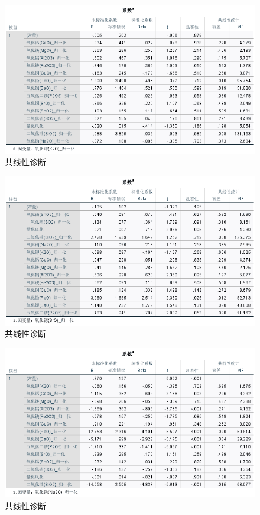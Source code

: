 \documentclass[UTF8]{ctexart}
\begin{document}
\begin{figure}[H]\centering
    \includegraphics[width=1\textwidth,height=0.6\textwidth]{img/1 (12).png} %
    \caption{共线性诊断} %
\end{figure}
\begin{figure}[H]\centering
    \includegraphics[width=1\textwidth,height=0.6\textwidth]{img/1 (13).png} %
    \caption{共线性诊断} %
\end{figure}
\begin{figure}[H]\centering
    \includegraphics[width=1\textwidth,height=0.6\textwidth]{img/1 (14).png} %
    \caption{共线性诊断} %
\end{figure}
\end{document}
